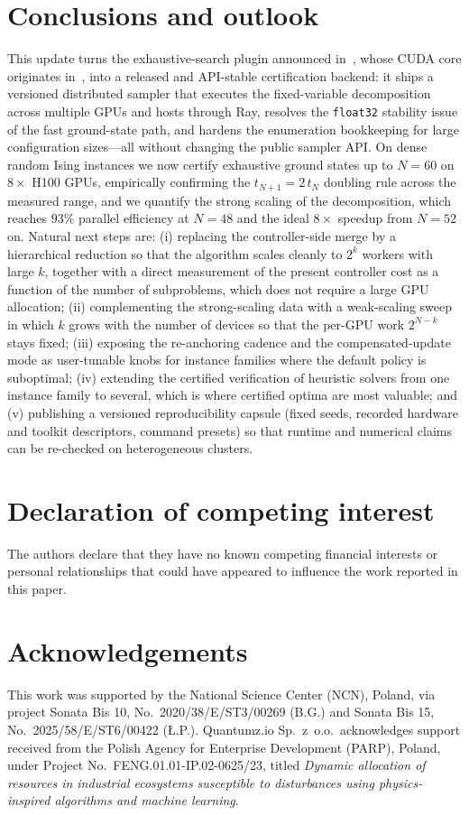\documentclass[preprint,12pt,a4paper]{elsarticle}
\begin{document}
\section{Conclusions and outlook}
\label{sec:conclusions}
This update turns the exhaustive-search plugin announced
in~\cite{jalowiecki2021omnisolver}, whose CUDA core originates
in~\cite{jalowiecki2021brute}, into a released and API-stable certification
backend: it ships a versioned distributed sampler that executes the
fixed-variable decomposition across multiple GPUs and hosts through Ray,
resolves the \texttt{float32} stability issue of the fast ground-state path, and
hardens the enumeration bookkeeping for large configuration sizes---all without
changing the public sampler API. On dense random Ising instances we now certify
exhaustive ground states up to $N=60$ on $8\times$ H100 GPUs, empirically
confirming the $t_{N+1}=2\,t_N$ doubling rule across the measured range, and we
quantify the strong scaling of the decomposition, which reaches $93\%$ parallel
efficiency at $N=48$ and the ideal $8\times$ speedup from $N=52$ on. Natural
next steps are: (i) replacing the controller-side merge by a hierarchical
reduction so that the algorithm scales cleanly to $2^k$ workers with large $k$,
together with a direct measurement of the present controller cost as a function
of the number of subproblems, which does not require a large GPU allocation;
(ii) complementing the strong-scaling data with a weak-scaling sweep in which
$k$ grows with the number of devices so that the per-GPU work $2^{N-k}$ stays
fixed; (iii) exposing the re-anchoring cadence and the compensated-update mode
as user-tunable knobs for instance families where the default policy is
suboptimal; (iv) extending the certified verification of heuristic solvers from
one instance family to several, which is where certified optima are most
valuable; and (v) publishing a versioned reproducibility capsule (fixed seeds,
recorded hardware and toolkit descriptors, command presets) so that runtime and
numerical claims can be re-checked on heterogeneous clusters.

\section*{Declaration of competing interest}
The authors declare that they have no known competing financial interests or
personal relationships that could have appeared to influence the work reported
in this paper.

\section*{Acknowledgements}
This work was supported by the National Science Center (NCN), Poland, via
project Sonata Bis 10, No.~2020/38/E/ST3/00269 (B.G.) and Sonata Bis 15,
No.~2025/58/E/ST6/00422 ({\L}.P.). Quantumz.io Sp.~z~o.o.\ acknowledges
support received from the Polish Agency for Enterprise Development (PARP),
Poland, under Project No.~FENG.01.01-IP.02-0625/23, titled
\textit{Dynamic allocation of resources in industrial ecosystems susceptible
to disturbances using physics-inspired algorithms and machine learning}.



\end{document}
